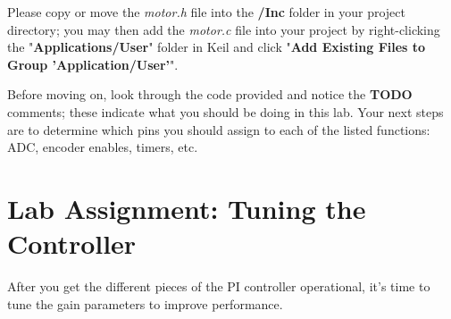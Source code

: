 \documentclass[openany,11pt,fleqn]{book} %
\begin{document}
Please copy or move the \textit{motor.h} file into the \textbf{/Inc} folder in your project directory; you may then add the \textit{motor.c} file into your project by right-clicking the "\textbf{Applications/User}" folder in Keil and click "\textbf{Add Existing Files to Group 'Application/User'}".

Before moving on, look through the code provided and notice the \textbf{TODO} comments; these indicate what you should be doing in this lab. Your next steps are to determine which pins you should assign to each of the listed functions: ADC, encoder enables, timers, etc.


\section{\color{blue}Lab Assignment: Tuning the Controller}

After you get the different pieces of the PI controller operational, it's time to tune the gain parameters to improve performance.
\end{document}
